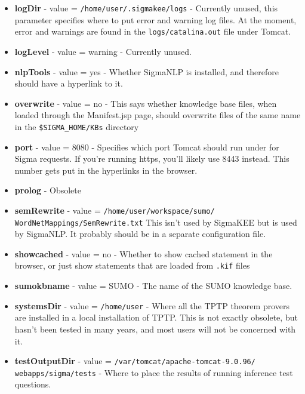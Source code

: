 \documentclass{book}
\begin{document}
\begin{itemize}
\item \textbf{logDir}  - value = \texttt{/home/user/.sigmakee/logs} - Currently
unused, this parameter specifies where to put error and warning log files.  At
the moment, error and warnings are found in the \texttt{logs/catalina.out} file
under Tomcat.

\item \textbf{logLevel}  - value = warning - Currently unused.

\item \textbf{nlpTools}  - value = yes - Whether SigmaNLP is installed, and therefore
should have a hyperlink to it.

\item \textbf{overwrite}  - value = no - This says whether knowledge base files, when
loaded through the Manifest.jsp page, should overwrite files of the same name in the
\texttt{\$SIGMA\_HOME/KBs} directory

  \item \textbf{port} - value = 8080 - Specifies which port Tomcat should run under
for Sigma requests.  If you're running https, you'll likely use 8443 instead.  This
number gets put in the hyperlinks in the browser.

  \item \textbf{prolog} - Obsolete

  \item \begin{sloppypar}\textbf{semRewrite} - value = \texttt{/home/user/workspace/sumo/ WordNetMappings/SemRewrite.txt}
This isn't used by SigmaKEE but is used by SigmaNLP.  It probably should be in a
separate configuration file.\end{sloppypar}

  \item \textbf{showcached} - value = no - Whether to show cached statement in the browser, or
just show statements that are loaded from \texttt{.kif} files

  \item \textbf{sumokbname} - value = SUMO - The name of the SUMO knowledge base.

  \item \textbf{systemsDir} - value = \texttt{/home/user}  - Where all the TPTP theorem provers
are installed in a local installation of TPTP.  This is not exactly obsolete, but hasn't
been tested in many years, and most users will not be concerned with it.

  \item \begin{sloppypar}\textbf{testOutputDir} - value = \texttt{/var/tomcat/apache-tomcat-9.0.96/ webapps/sigma/tests}
- Where to place the results of running inference test questions.\end{sloppypar}


\end{itemize}
\end{document}
